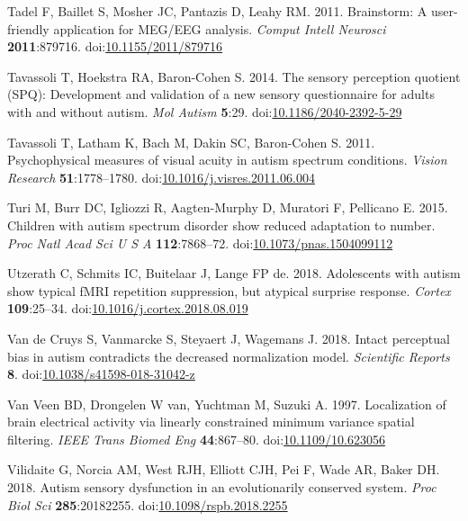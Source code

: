\documentclass[
]{article}
\newlength{\cslhangindent}
\newlength{\cslentryspacingunit} %
\newenvironment{CSLReferences}[2] %
 {%
  \setlength{\parindent}{0pt}
  \ifodd #1
  \let\oldpar\par
  \def\par{\hangindent=\cslhangindent\oldpar}
  \fi
  \setlength{\parskip}{#2\cslentryspacingunit}
 }%
 {}
\begin{document}
\begin{CSLReferences}{1}{0}
\leavevmode{}%
Tadel F, Baillet S, Mosher JC, Pantazis D, Leahy RM. 2011. Brainstorm: A user-friendly application for MEG/EEG analysis. \emph{Comput Intell Neurosci} \textbf{2011}:879716. doi:\href{https://doi.org/10.1155/2011/879716}{10.1155/2011/879716}

\leavevmode{}%
Tavassoli T, Hoekstra RA, Baron-Cohen S. 2014. The sensory perception quotient (SPQ): Development and validation of a new sensory questionnaire for adults with and without autism. \emph{Mol Autism} \textbf{5}:29. doi:\href{https://doi.org/10.1186/2040-2392-5-29}{10.1186/2040-2392-5-29}

\leavevmode{}%
Tavassoli T, Latham K, Bach M, Dakin SC, Baron-Cohen S. 2011. Psychophysical measures of visual acuity in autism spectrum conditions. \emph{Vision Research} \textbf{51}:1778--1780. doi:\href{https://doi.org/10.1016/j.visres.2011.06.004}{10.1016/j.visres.2011.06.004}

\leavevmode{}%
Turi M, Burr DC, Igliozzi R, Aagten-Murphy D, Muratori F, Pellicano E. 2015. Children with autism spectrum disorder show reduced adaptation to number. \emph{Proc Natl Acad Sci U S A} \textbf{112}:7868--72. doi:\href{https://doi.org/10.1073/pnas.1504099112}{10.1073/pnas.1504099112}

\leavevmode{}%
Utzerath C, Schmits IC, Buitelaar J, Lange FP de. 2018. Adolescents with autism show typical fMRI repetition suppression, but atypical surprise response. \emph{Cortex} \textbf{109}:25--34. doi:\href{https://doi.org/10.1016/j.cortex.2018.08.019}{10.1016/j.cortex.2018.08.019}

\leavevmode{}%
Van de Cruys S, Vanmarcke S, Steyaert J, Wagemans J. 2018. Intact perceptual bias in autism contradicts the decreased normalization model. \emph{Scientific Reports} \textbf{8}. doi:\href{https://doi.org/10.1038/s41598-018-31042-z}{10.1038/s41598-018-31042-z}

\leavevmode{}%
Van Veen BD, Drongelen W van, Yuchtman M, Suzuki A. 1997. Localization of brain electrical activity via linearly constrained minimum variance spatial filtering. \emph{IEEE Trans Biomed Eng} \textbf{44}:867--80. doi:\href{https://doi.org/10.1109/10.623056}{10.1109/10.623056}

\leavevmode{}%
Vilidaite G, Norcia AM, West RJH, Elliott CJH, Pei F, Wade AR, Baker DH. 2018. Autism sensory dysfunction in an evolutionarily conserved system. \emph{Proc Biol Sci} \textbf{285}:20182255. doi:\href{https://doi.org/10.1098/rspb.2018.2255}{10.1098/rspb.2018.2255}


\end{CSLReferences}
\end{document}
